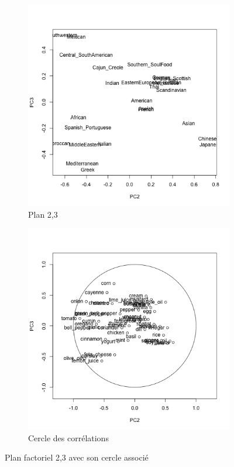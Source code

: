 \documentclass[a4paper,11pt,oneside,roman]{article}
\begin{document}
    \begin{figure}
        \centering
        \begin{subfigure}{.5\textwidth}
          \centering
          \includegraphics[width=.8\linewidth]{imgs/acp_plan_2_3.png}
          \caption{Plan 2,3}
          \label{fig:sub1}
        \end{subfigure}%
        \begin{subfigure}{.5\textwidth}
          \centering
          \includegraphics[width=.8\linewidth]{imgs/cercle_plan_2_3.png}
          \caption{Cercle des corrélations}
          \label{fig:sub2}
        \end{subfigure}
        \caption{Plan factoriel 2,3 avec son cercle associé}
        \label{fig_acp_plan_2_3}
    \end{figure}
\end{document}
